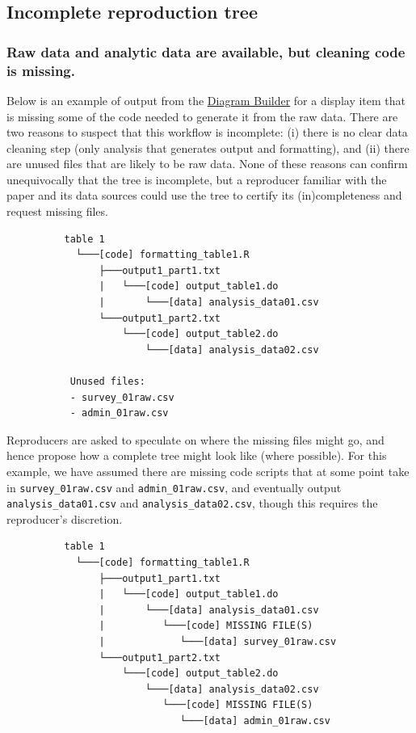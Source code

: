 \documentclass[
  openany]{book}
\begin{document}
\hypertarget{incomplete-reproduction-tree}{%
\subsection{Incomplete reproduction tree}\label{incomplete-reproduction-tree}}

\hypertarget{raw-data-and-analytic-data-are-available-but-cleaning-code-is-missing.}{%
\subsubsection{Raw data and analytic data are available, but cleaning code is missing.}\label{raw-data-and-analytic-data-are-available-but-cleaning-code-is-missing.}}

Below is an example of output from the \protect\hyperlink{diagram}{Diagram Builder} for a display item that is missing some of the code needed to generate it from the raw data. There are two reasons to suspect that this workflow is incomplete: (i) there is no clear data cleaning step (only analysis that generates output and formatting), and (ii) there are unused files that are likely to be raw data. None of these reasons can confirm unequivocally that the tree is incomplete, but a reproducer familiar with the paper and its data sources could use the tree to certify its (in)completeness and request missing files.

\begin{verbatim}
          table 1
            └───[code] formatting_table1.R
                ├───output1_part1.txt  
                |   └───[code] output_table1.do           
                |       └───[data] analysis_data01.csv
                └───output1_part2.txt  
                    └───[code] output_table2.do           
                        └───[data] analysis_data02.csv

           Unused files: 
           - survey_01raw.csv
           - admin_01raw.csv  
\end{verbatim}

Reproducers are asked to speculate on where the missing files might go, and hence propose how a complete tree might look like (where possible). For this example, we have assumed there are missing code scripts that at some point take in \texttt{survey\_01raw.csv} and \texttt{admin\_01raw.csv}, and eventually output \texttt{analysis\_data01.csv} and \texttt{analysis\_data02.csv}, though this requires the reproducer's discretion.

\begin{verbatim}
          table 1
            └───[code] formatting_table1.R
                ├───output1_part1.txt  
                |   └───[code] output_table1.do           
                |       └───[data] analysis_data01.csv
                |          └───[code] MISSING FILE(S)
                |             └───[data] survey_01raw.csv
                └───output1_part2.txt  
                    └───[code] output_table2.do           
                        └───[data] analysis_data02.csv
                           └───[code] MISSING FILE(S)
                              └───[data] admin_01raw.csv  
\end{verbatim}
\end{document}
